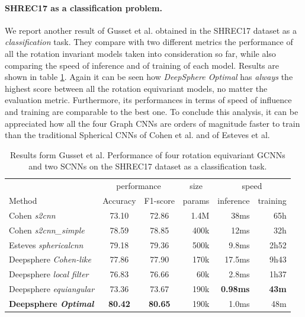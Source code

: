 \paragraph{SHREC17 as a classification problem.}We report another result of Gusset et al. \cite{Gusset} obtained in the SHREC17 dataset as a \textit{classification} task. They compare with two different metrics the performance of all the rotation invariant models taken into consideration so far, while also comparing the speed of inference and of training of each model. Results are shown in table \ref{tab:SHREC17_class}. Again it can be seen how \textit{DeepSphere Optimal} has \textit{always} the highest score between all the rotation equivariant models, no matter the evaluation metric. Furthermore, its performances in terms of speed of influence and training are comparable to the best one. To conclude this analysis, it can be appreciated how all the four Graph CNNs are orders of magnitude faster to train than the traditional Spherical CNNs of Cohen et al. and of Esteves et al. 
\begin{table}[ht]
	\centering
	\begin{tabular}{l|c c r r r}
		\multicolumn{1}{l}{} & \multicolumn{2}{c}{performance} & \multicolumn{1}{c}{size} & \multicolumn{2}{c}{speed}\\
		\cmidrule(lr){2-3} \cmidrule(lr){4-4} \cmidrule(lr){5-6}
		\multicolumn{1}{l}{Method} & Accuracy & F1-score & params & inference & training \\ \hline
		Cohen \emph{s2cnn} & 73.10 & 72.86 & 1.4M & 38ms & 65h\\
		Cohen \emph{s2cnn\_simple} & 78.59 & 78.85 & 400k & 12ms & 32h\\
		Esteves \emph{sphericalcnn} & 79.18 & 79.36 & 500k & 9.8ms & 2h52\\ \hline
		Deepsphere \emph{Cohen-like} & 77.86 & 77.90 & 170k & 17.5ms & 9h43\\
		Deepsphere \emph{local filter} & 76.83 & 76.66 & 60k & 2.8ms & 1h37\\
		Deepsphere \emph{equiangular} & 73.36 & 73.67 & 190k & \textbf{0.98ms} & \textbf{43m} \\
		\textbf{Deepsphere \emph{Optimal}} & \textbf{80.42} & \textbf{80.65} & 190k & 1.0ms & 48m
	\end{tabular}
	\caption{Results form Gusset et al. Performance of four rotation equivariant GCNNs and two SCNNs on the SHREC17 dataset as a classification task.}
	\label{tab:SHREC17_class}
\end{table}
